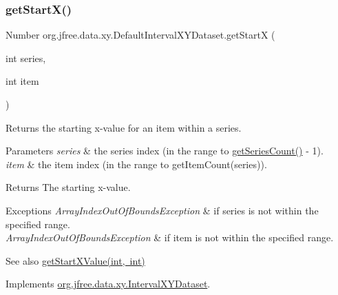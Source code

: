 \subsubsection{\texorpdfstring{get\+Start\+X()}{getStartX()}}
{\footnotesize\ttfamily Number org.\+jfree.\+data.\+xy.\+Default\+Interval\+X\+Y\+Dataset.\+get\+StartX (\begin{DoxyParamCaption}\item[{int}]{series,  }\item[{int}]{item }\end{DoxyParamCaption})}

Returns the starting x-\/value for an item within a series.


\begin{DoxyParams}{Parameters}
{\em series} & the series index (in the range {} to {\ttfamily \mbox{\hyperlink{classorg_1_1jfree_1_1data_1_1xy_1_1_default_interval_x_y_dataset_a11470bfa9b540c971123d4282c0f5a8a}{get\+Series\+Count()}} -\/ 1}). \\
\hline
{\em item} & the item index (in the range {} to {\ttfamily get\+Item\+Count(series)}).\\
\hline
\end{DoxyParams}
\begin{DoxyReturn}{Returns}
The starting x-\/value.
\end{DoxyReturn}

\begin{DoxyExceptions}{Exceptions}
{\em Array\+Index\+Out\+Of\+Bounds\+Exception} & if {\ttfamily series} is not within the specified range. \\
\hline
{\em Array\+Index\+Out\+Of\+Bounds\+Exception} & if {\ttfamily item} is not within the specified range.\\
\hline
\end{DoxyExceptions}
\begin{DoxySeeAlso}{See also}
\mbox{\hyperlink{classorg_1_1jfree_1_1data_1_1xy_1_1_default_interval_x_y_dataset_abe34d984a43f87ac2880c8878c71587d}{get\+Start\+X\+Value(int, int)}} 
\end{DoxySeeAlso}


Implements \mbox{\hyperlink{interfaceorg_1_1jfree_1_1data_1_1xy_1_1_interval_x_y_dataset_a7548ec7d60d72463313dc6f10aceee62}{org.\+jfree.\+data.\+xy.\+Interval\+X\+Y\+Dataset}}.

\mbox{\label{classorg_1_1jfree_1_1data_1_1xy_1_1_default_interval_x_y_dataset_abe34d984a43f87ac2880c8878c71587d}} 
